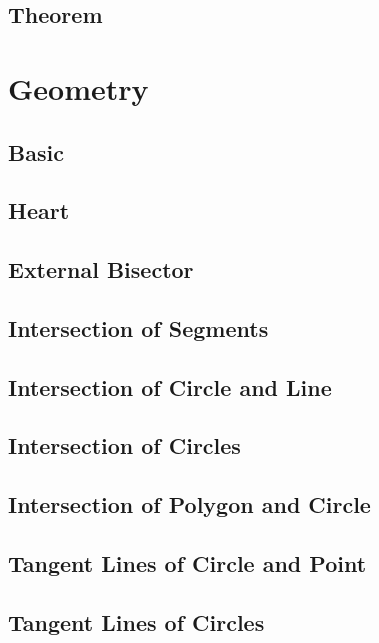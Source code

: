 \subsection{Theorem}


\section{Geometry}
\subsection{Basic}

\subsection{Heart}

\subsection{External Bisector}

\subsection{Intersection of Segments}

\subsection{Intersection of Circle and Line}

\subsection{Intersection of Circles}

\subsection{Intersection of Polygon and Circle}

\subsection{Tangent Lines of Circle and Point}

\subsection{Tangent Lines of Circles}

